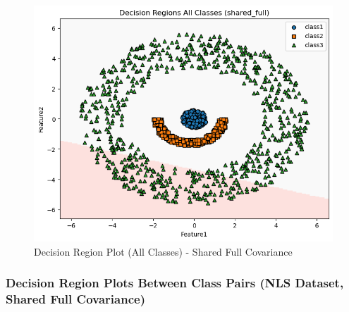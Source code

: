 \begin{figure}[H]
    \centering
    \includegraphics[width=\linewidth]{images/NLS_Group04_images/02_shared_full/05_decision_region_all.png}
    \caption{Decision Region Plot (All Classes) - Shared Full Covariance}
\end{figure}

\subsubsection{Decision Region Plots Between Class Pairs (NLS Dataset, Shared Full Covariance)}

